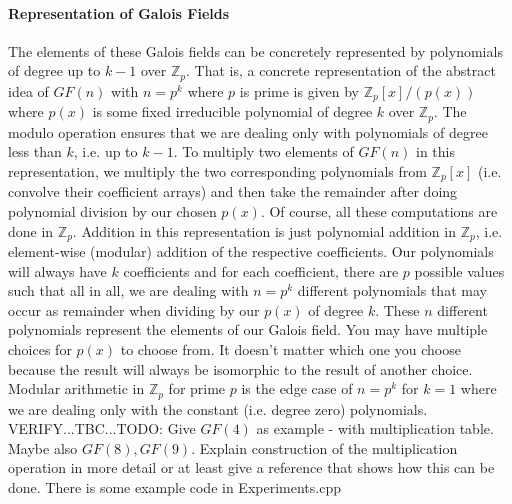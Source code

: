 \paragraph{Representation of Galois Fields}
The elements of these Galois fields can be concretely represented by polynomials of degree up to $k-1$ over $\mathbb{Z}_p$. That is, a concrete representation of the abstract idea of $GF(n)$ with $n = p^k$ where $p$ is prime is given by $\mathbb{Z}_p[x] / (p(x))$ where $p(x)$ is some fixed irreducible polynomial of degree $k$ over $\mathbb{Z}_p$. The modulo operation ensures that we are dealing only with polynomials of degree less than $k$, i.e. up to $k-1$. To multiply two elements of $GF(n)$ in this representation, we multiply the two corresponding polynomials from $\mathbb{Z}_p[x]$ (i.e. convolve their coefficient arrays) and then take the remainder after doing polynomial division by our chosen $p(x)$. Of course, all these computations are done in $\mathbb{Z}_p$. Addition in this representation is just polynomial addition in $\mathbb{Z}_p$, i.e. element-wise (modular) addition of the respective coefficients. Our polynomials will always have $k$ coefficients and for each coefficient, there are $p$ possible values such that all in all, we are dealing with $n = p^k$ different polynomials that may occur as remainder when dividing by our $p(x)$ of degree $k$. These $n$ different polynomials represent the elements of our Galois field. You may have multiple choices for $p(x)$ to choose from. It doesn't matter which one you choose because the result will always be isomorphic to the result of another choice. Modular arithmetic in $\mathbb{Z}_p$ for prime $p$ is the edge case of $n = p^k$ for $k = 1$ where we are dealing only with the constant (i.e. degree zero) polynomials. VERIFY...TBC...TODO: Give $GF(4)$ as example - with multiplication table. Maybe also $GF(8), GF(9)$. Explain construction of the multiplication operation in more detail or at least give a reference that shows how this can be done. There is some example code in Experiments.cpp





